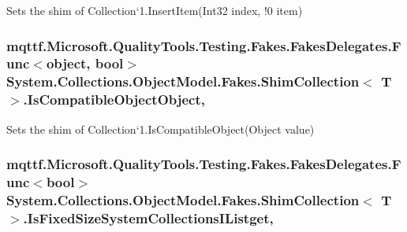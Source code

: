 Sets the shim of Collection`1.Insert\-Item(Int32 index, !0 item)

\hypertarget{class_system_1_1_collections_1_1_object_model_1_1_fakes_1_1_shim_collection_3_01_t_01_4_aae635751e6b794c6cb6df1771ed7c9e6}{
\subsubsection[{Is\-Compatible\-Object\-Object}]{\setlength{\rightskip}{0pt plus 5cm}mqttf.\-Microsoft.\-Quality\-Tools.\-Testing.\-Fakes.\-Fakes\-Delegates.\-Func$<$object, bool$>$ System.\-Collections.\-Object\-Model.\-Fakes.\-Shim\-Collection$<$ T $>$.Is\-Compatible\-Object\-Object\hspace{0.3cm}{\ttfamily [static]}, {\ttfamily [set]}}}\label{class_system_1_1_collections_1_1_object_model_1_1_fakes_1_1_shim_collection_3_01_t_01_4_aae635751e6b794c6cb6df1771ed7c9e6}


Sets the shim of Collection`1.Is\-Compatible\-Object(\-Object value)

\hypertarget{class_system_1_1_collections_1_1_object_model_1_1_fakes_1_1_shim_collection_3_01_t_01_4_a069fd424213d43562e78d556012b182f}{
\subsubsection[{Is\-Fixed\-Size\-System\-Collections\-I\-Listget}]{\setlength{\rightskip}{0pt plus 5cm}mqttf.\-Microsoft.\-Quality\-Tools.\-Testing.\-Fakes.\-Fakes\-Delegates.\-Func$<$bool$>$ System.\-Collections.\-Object\-Model.\-Fakes.\-Shim\-Collection$<$ T $>$.Is\-Fixed\-Size\-System\-Collections\-I\-Listget\hspace{0.3cm}{\ttfamily [get]}, {\ttfamily [set]}}}\label{class_system_1_1_collections_1_1_object_model_1_1_fakes_1_1_shim_collection_3_01_t_01_4_a069fd424213d43562e78d556012b182f}


